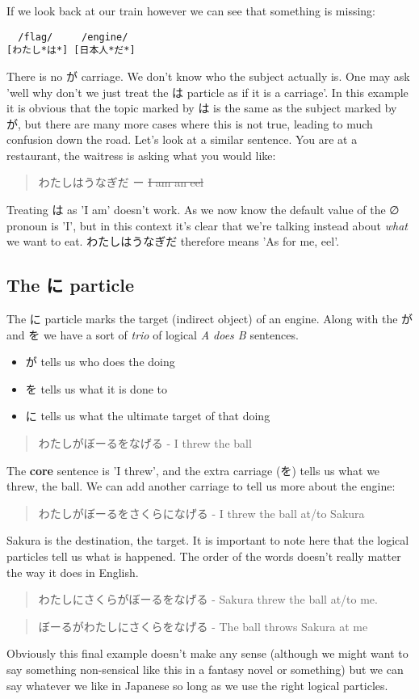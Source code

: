 \documentclass[11pt]{article}
\begin{document}
If we look back at our train however we can see that something is missing:
\begin{verbatim}
  /flag/     /engine/
[わたし*は*] [日本人*だ*]
\end{verbatim}

There is no が carriage. We don't know who the subject actually is. One may ask 'well why don't we just treat the は particle as if it is a carriage'. In this example it is obvious that the topic marked by は is the same as the subject marked by が, but there are many more cases where this is not true, leading to much confusion down the road. Let's look at a similar sentence. You are at a restaurant, the waitress is asking what you would like:
\begin{quote}
わたしはうなぎだ ー \sout{I am an eel}
\end{quote}

Treating は as 'I am' doesn't work. As we now know the default value of the ∅ pronoun is 'I', but in this context it's clear that we're talking instead about \emph{what} we want to eat. わたしはうなぎだ therefore means 'As for me, eel'.

\subsection{The に particle}
\label{sec:org3f37d85}
The に particle marks the target (indirect object) of an engine. Along with the が and を we have a sort of \emph{trio} of logical \emph{A does B} sentences.

\begin{itemize}
\item が tells us who does the doing
\item を tells us what it is done to
\item に tells us what the ultimate target of that doing
\end{itemize}

\begin{quote}
わたしがぼーるをなげる - I threw the ball
\end{quote}
The \textbf{core} sentence is 'I threw', and the extra carriage (を) tells us what we threw, the ball. We can add another carriage to tell us more about the engine:
\begin{quote}
わたしがぼーるをさくらになげる - I threw the ball at/to Sakura
\end{quote}
Sakura is the destination, the target. It is important to note here that the logical particles tell us what is happened. The order of the words doesn't really matter the way it does in English.
\begin{quote}
わたしにさくらがぼーるをなげる - Sakura threw the ball at/to me.
\end{quote}
\begin{quote}
ぼーるがわたしにさくらをなげる - The ball throws Sakura at me
\end{quote}
Obviously this final example doesn't make any sense (although we might want to say something non-sensical like this in a fantasy novel or something) but we can say whatever we like in Japanese so long as we use the right logical particles.
\end{document}
